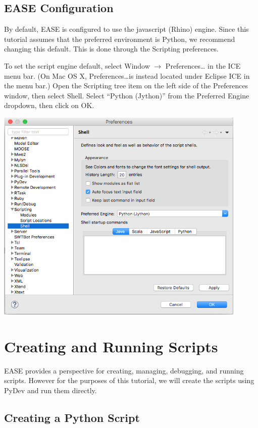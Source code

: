 \documentclass{article}
\begin{document}
\subsection{EASE Configuration}

By default, EASE is configured to use the javascript (Rhino) engine. Since this
tutorial assumes that the preferred environment is Python, we recommend changing
this default. This is done through the Scripting preferences.

To set the script engine default, select Window $\rightarrow$ Preferences\ldots
in the ICE menu bar. (On Mac OS X, Preferences\ldots is instead located under
Eclipse ICE in the menu bar.) Open the Scripting tree item on the left side of
the Preferences window, then select Shell. Select ``Python (Jython)'' from the
Preferred Engine dropdown, then click on OK.

\begin{center}
\includegraphics[width=12cm]{images/scripting-prefs}
\end{center}

\section{Creating and Running Scripts}

EASE provides a perspective for creating, managing, debugging, and running
scripts. However for the purposes of this tutorial, we will create the scripts
using PyDev and run them directly.

\subsection{Creating a Python Script}
\end{document}
